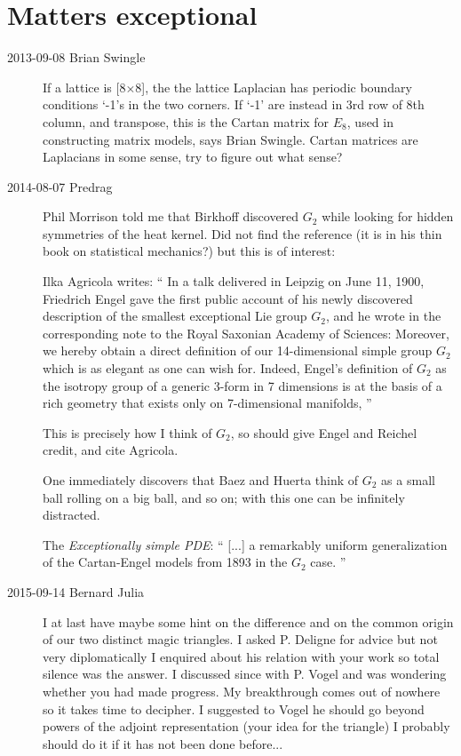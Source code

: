 

\chapter{Matters exceptional}
\label{s-groupTheBlog}



\begin{description}

\item[2013-09-08  Brian Swingle]
If a lattice is [8$\times$8], the
the lattice Laplacian has periodic boundary conditions `-1's in the two
corners. If `-1' are instead in 3rd row of 8th column, and transpose,
this is the Cartan matrix for $E_8$, used in constructing matrix models,
says
{Brian Swingle}. Cartan matrices are Laplacians in some sense, try to
figure out what sense?

\item[2014-08-07  Predrag]
Phil Morrison told me that Birkhoff discovered $G_2$ while looking for
hidden symmetries of the heat kernel. Did not find the reference (it is
in his thin book on statistical mechanics?) but this is of interest:

Ilka Agricola writes:
``
In a talk delivered in Leipzig on June 11, 1900, Friedrich
Engel gave the first public account of his newly discovered
description of the smallest exceptional Lie group $G_2$, and he wrote in
the corresponding note to the Royal Saxonian Academy of Sciences:
Moreover, we hereby obtain a direct definition of our 14-dimensional
simple group $G_2$ which is as elegant as one can wish for. Indeed,
Engel's definition of $G_2$ as the isotropy group of a generic 3-form in
7 dimensions is at the basis of a rich geometry that exists only on
7-dimensional manifolds,
''

This is precisely how I think of $G_2$, so should give Engel and
Reichel credit, and
cite Agricola.

One immediately discovers that Baez and Huerta think of
$G_2$ as a small ball rolling on a big ball, and so on; with this one can
be infinitely distracted.

The {\em Exceptionally simple PDE}: ``
[...] a remarkably uniform generalization of the Cartan-Engel models from
1893 in the $G_2$ case.
''

\item[2015-09-14 Bernard Julia]
I at last have maybe some hint on the difference and on the common origin
of our two distinct magic triangles. I asked P. Deligne for advice but not
very diplomatically I enquired about his relation with your work so total
silence was the answer.
I discussed since with P. Vogel and was wondering whether you had made
progress. My breakthrough comes out of nowhere so it takes time to
decipher.
I suggested to Vogel he should go beyond powers of the adjoint
representation (your idea for the triangle) I probably should do it if it
has not been done before...


\end{description}

